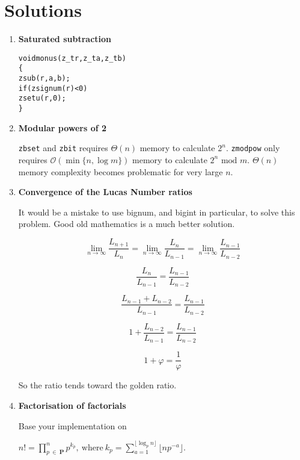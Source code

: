 \chapter{Solutions}
\label{chap:Solutions}


\begin{enumerate}[label=\textbf{\arabic*}.]

\item \textbf{Saturated subtraction}

\vspace{-1em}
\begin{alltt}
void monus(z_t r, z_t a, z_t b)
\{
    zsub(r, a, b);
    if (zsignum(r) < 0)
        zsetu(r, 0);
\}
\end{alltt}
\vspace{-1em}


\item \textbf{Modular powers of 2}

\texttt{zbset} and \texttt{zbit} requires $\Theta(n)$
memory to calculate $2^n$. \texttt{zmodpow} only
requires $\mathcal{O}(\min \{n, \log m\})$ memory
to calculate $2^n \text{ mod } m$. $\Theta(n)$
memory complexity becomes problematic for very
large $n$.


\item \textbf{Convergence of the Lucas Number ratios}

It would be a mistake to use bignum, and bigint in particular,
to solve this problem. Good old mathematics is a much better solution.

$$ \lim_{n \to \infty} \frac{L_{n + 1}}{L_n} = \lim_{n \to \infty} \frac{L_{n}}{L_{n - 1}} = \lim_{n \to \infty} \frac{L_{n - 1}}{L_{n - 2}} $$

$$ \frac{L_{n}}{L_{n - 1}} = \frac{L_{n - 1}}{L_{n - 2}} $$

$$ \frac{L_{n - 1} + L_{n - 2}}{L_{n - 1}} = \frac{L_{n - 1}}{L_{n - 2}} $$

$$ 1 + \frac{L_{n - 2}}{L_{n - 1}} = \frac{L_{n - 1}}{L_{n - 2}} $$

$$ 1 + \varphi = \frac{1}{\varphi} $$

So the ratio tends toward the golden ratio.



\item \textbf{Factorisation of factorials}

Base your implementation on

\( \displaystyle{
    n! = \prod_{p~\in~\textbf{P}}^{n} p^{k_p}, ~\text{where}~
    k_p = \sum_{a = 1}^{\lfloor \log_p n \rfloor} \lfloor np^{-a} \rfloor.
}\)


\end{enumerate}
